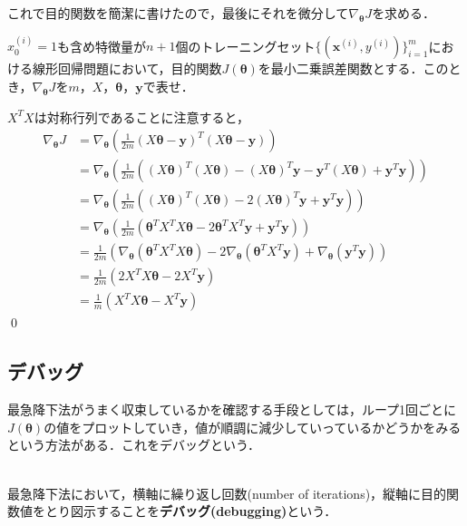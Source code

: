 これで目的関数を簡潔に書けたので，最後にそれを微分して$\nabla_{{\bm \theta}}J$を求める．
\begin{qu}
$x_0^{(i)}=1$も含め特徴量が$n+1$個のトレーニングセット$\{({\bm x}^{(i)},y^{(i)})\}_{i=1}^m$における線形回帰問題において，目的関数$J({\bm \theta})$を最小二乗誤差関数とする．このとき，$\nabla_{{\bm \theta}}J$を$m$，$X$，${\bm \theta}$，${\bm y}$で表せ．
\end{qu}
\begin{ans}
$X^TX$は対称行列であることに注意すると，
\begin{align}
\nabla_{{\bm \theta}}J&=\nabla_{{\bm \theta}}\left(\frac{1}{2m}(X{\bm \theta}-{\bm y})^T(X{\bm \theta}-{\bm y})\right) \nonumber\\
&=\nabla_{{\bm \theta}}\left(\frac{1}{2m}\left((X{\bm \theta})^T(X{\bm \theta})-(X{\bm \theta})^T{\bm y}-{\bm y}^T(X{\bm \theta})+{\bm y}^T{\bm y}\right)\right)\nonumber\\
&=\nabla_{{\bm \theta}}\left(\frac{1}{2m}\left((X{\bm \theta})^T(X{\bm \theta})-2(X{\bm \theta})^T{\bm y}+{\bm y}^T{\bm y}\right)\right)\nonumber\\
&=\nabla_{{\bm \theta}}\left(\frac{1}{2m}\left( {\bm \theta}^TX^TX{\bm \theta}-2{\bm \theta}^TX^T{\bm y}+{\bm y}^T{\bm y} \right)\right) \nonumber\\
&=\frac{1}{2m}\left(\nabla_{{\bm \theta}}({\bm \theta}^TX^TX{\bm \theta})-2\nabla_{{\bm \theta}}({\bm \theta}^TX^T{\bm y})+\nabla_{{\bm \theta}}({\bm y}^T{\bm y})\right)\nonumber\\
&=\frac{1}{2m}\left(2X^TX{\bm \theta}-2X^T{\bm y}\right)\nonumber \\
&=\frac{1}{m}\left(X^TX{\bm \theta}-X^T{\bm y}\right)
\end{align}\qed
\end{ans}

\subsection{デバッグ}

最急降下法がうまく収束しているかを確認する手段としては，ループ1回ごとに$J({\bm \theta})$の値をプロットしていき，値が順調に減少していっているかどうかをみるという方法がある．これをデバッグという．

\begin{defi}[デバッグ]
　\\
最急降下法において，横軸に繰り返し回数(number of iterations)，縦軸に目的関数値をとり図示することを{\bf デバッグ(debugging)}という．
\end{defi}

